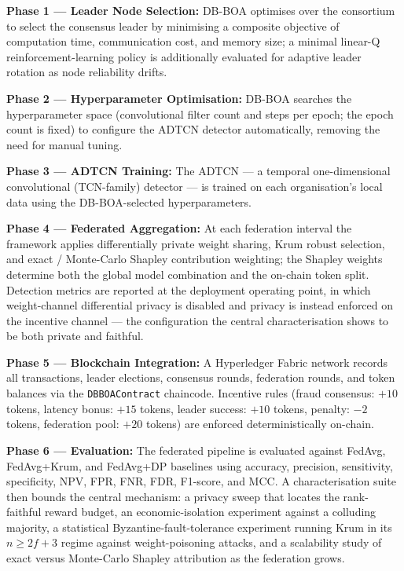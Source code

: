 \textbf{Phase 1 — Leader Node Selection:} DB-BOA optimises over the consortium to select the consensus leader by minimising a composite objective of computation time, communication cost, and memory size; a minimal linear-Q reinforcement-learning policy is additionally evaluated for adaptive leader rotation as node reliability drifts.

\textbf{Phase 2 — Hyperparameter Optimisation:} DB-BOA searches the hyperparameter space (convolutional filter count and steps per epoch; the epoch count is fixed) to configure the ADTCN detector automatically, removing the need for manual tuning.

\textbf{Phase 3 — ADTCN Training:} The ADTCN — a temporal one-dimensional convolutional (TCN-family) detector — is trained on each organisation's local data using the DB-BOA-selected hyperparameters.

\textbf{Phase 4 — Federated Aggregation:} At each federation interval the framework applies differentially private weight sharing, Krum robust selection, and exact / Monte-Carlo Shapley contribution weighting; the Shapley weights determine both the global model combination and the on-chain token split. Detection metrics are reported at the deployment operating point, in which weight-channel differential privacy is disabled and privacy is instead enforced on the incentive channel — the configuration the central characterisation shows to be both private and faithful.

\textbf{Phase 5 — Blockchain Integration:} A Hyperledger Fabric network records all transactions, leader elections, consensus rounds, federation rounds, and token balances via the \texttt{DBBOAContract} chaincode. Incentive rules (fraud consensus: $+10$ tokens, latency bonus: $+15$ tokens, leader success: $+10$ tokens, penalty: $-2$ tokens, federation pool: $+20$ tokens) are enforced deterministically on-chain.

\textbf{Phase 6 — Evaluation:} The federated pipeline is evaluated against FedAvg, FedAvg+Krum, and FedAvg+DP baselines using accuracy, precision, sensitivity, specificity, NPV, FPR, FNR, FDR, F1-score, and MCC. A characterisation suite then bounds the central mechanism: a privacy sweep that locates the rank-faithful reward budget, an economic-isolation experiment against a colluding majority, a statistical Byzantine-fault-tolerance experiment running Krum in its $n\ge 2f+3$ regime against weight-poisoning attacks, and a scalability study of exact versus Monte-Carlo Shapley attribution as the federation grows.

